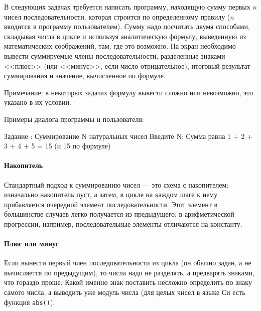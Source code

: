 
В следующих задачах требуется написать программу, находящую сумму первых $n$
чисел последовательности, которая строится по определенному правилу ($n$ вводится в программу
пользователем). Сумму надо посчитать двумя способами, складывая числа в цикле и
используя аналитическую формулу, выведенную из математических соображений, там, где это возможно.
На экран необходимо вывести
суммируемые члены последовательности, разделенные знаками <<плюс>> (или <<минус>>, если число
отрицательное), итоговый результат суммирования и значение, вычисленное по формуле.

Примечание: в некоторых задачах формулу вывести сложно или невозможно, это
указано в их условии.

Примеры диалога программы и пользователя:

\begin{zzoutput}
  Задание : Суммирование N натуральных чисел
  Введите N: 
  Сумма равна 1 + 2 + 3 + 4 + 5 = 15 (и 15 по формуле)
\end{zzoutput}


\zzsectionCOMMENTS

\paragraph{Накопитель}
Стандартный подход к суммированию чисел --- это схема с накопителем: изначально
накопитель пуст, а затем, в цикле на каждом шаге к нему прибавляется очередной
элемент последовательности. Этот элемент в большинстве случаев легко получается
из предыдущего: в арифметической прогрессии, например, последовательные элементы
отличаются на константу.

\paragraph{Плюс или минус}
Если вынести первый член последовательности из цикла (он обычно задан, а не
вычисляется по предыдущим), то числа надо не разделять, а предварять знаками,
что гораздо проще. Какой именно знак поставить несложно определить по знаку
самого числа, а выводить уже модуль числа (для целых чисел в языке Си есть
функция \texttt{abs()}).


